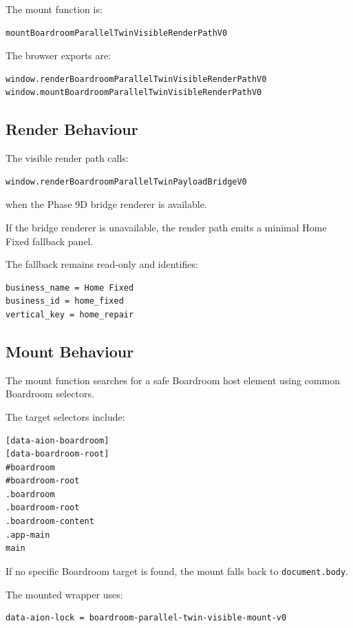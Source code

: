 The mount function is:

\begin{verbatim}
mountBoardroomParallelTwinVisibleRenderPathV0
\end{verbatim}

The browser exports are:

\begin{verbatim}
window.renderBoardroomParallelTwinVisibleRenderPathV0
window.mountBoardroomParallelTwinVisibleRenderPathV0
\end{verbatim}

\subsection{Render Behaviour}

The visible render path calls:

\begin{verbatim}
window.renderBoardroomParallelTwinPayloadBridgeV0
\end{verbatim}

when the Phase 9D bridge renderer is available.

If the bridge renderer is unavailable, the render path emits a minimal Home Fixed fallback panel.

The fallback remains read-only and identifies:

\begin{verbatim}
business_name = Home Fixed
business_id = home_fixed
vertical_key = home_repair
\end{verbatim}

\subsection{Mount Behaviour}

The mount function searches for a safe Boardroom host element using common Boardroom selectors.

The target selectors include:

\begin{verbatim}
[data-aion-boardroom]
[data-boardroom-root]
#boardroom
#boardroom-root
.boardroom
.boardroom-root
.boardroom-content
.app-main
main
\end{verbatim}

If no specific Boardroom target is found, the mount falls back to \texttt{document.body}.

The mounted wrapper uses:

\begin{verbatim}
data-aion-lock = boardroom-parallel-twin-visible-mount-v0
\end{verbatim}

